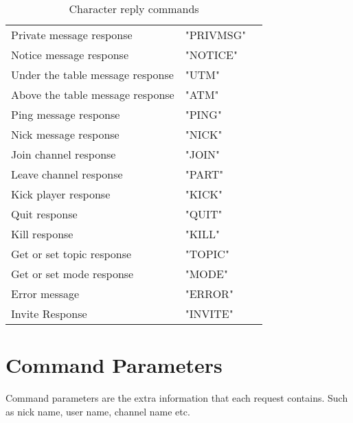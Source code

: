 \documentclass[oneside,titlepage,a4paper]{Definition/retrospy} %
\begin{document}
\begin{table}[H]
	\centering
	\begin{tabular}{|p{4.5cm}|l|p{4cm}|}
	\hline 		\tbf{Name}&\tbf{Value}&\tbf{Description}\\\hline
	Private message response&"PRIVMSG"&\\\hline
	Notice message response&"NOTICE"&\\\hline
	Under the table message response&"UTM"&\\\hline
	Above the table message response&"ATM"&\\\hline
	Ping message response&"PING"&\\\hline
	Nick message response&"NICK"&\\\hline
	Join channel response&"JOIN"&\\\hline
	Leave channel response&"PART"&\\\hline
	Kick player response&"KICK"&\\\hline
	Quit response&"QUIT"&\\\hline
	Kill response&"KILL"&\\\hline
	Get or set topic response&"TOPIC"&\\\hline
	Get or set mode response&"MODE"&\\\hline
	Error message&"ERROR"&\\\hline
	Invite Response&"INVITE"&\\\hline
	\end{tabular}
\caption{Character reply commands}
\label{Character reply commands}
\end{table}

\section{Command Parameters}
Command parameters are the extra information that each request contains. Such as nick name, user name, channel name etc.
\end{document}
